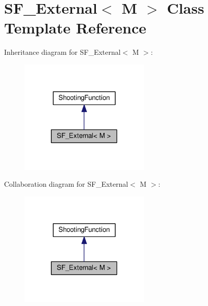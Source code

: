 \hypertarget{classSF__External}{}\section{S\+F\+\_\+\+External$<$ M $>$ Class Template Reference}
\label{classSF__External}


Inheritance diagram for S\+F\+\_\+\+External$<$ M $>$\+:\nopagebreak
\begin{figure}[H]
\begin{center}
\leavevmode
\includegraphics[width=177pt]{classSF__External__inherit__graph}
\end{center}
\end{figure}


Collaboration diagram for S\+F\+\_\+\+External$<$ M $>$\+:\nopagebreak
\begin{figure}[H]
\begin{center}
\leavevmode
\includegraphics[width=177pt]{classSF__External__coll__graph}
\end{center}
\end{figure}
